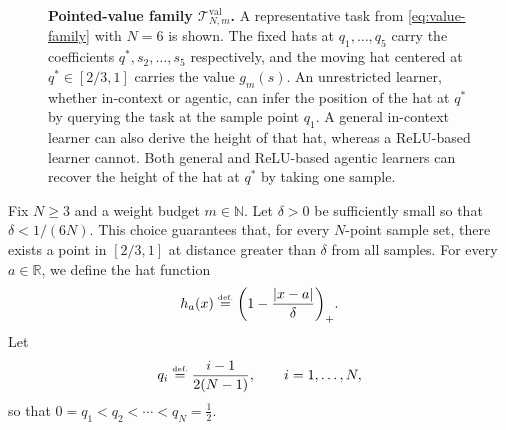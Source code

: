 \documentclass{article}
\newcommand{\eqdef }{\ensuremath{\stackrel{\mbox{\upshape\tiny def.}}{=}}}
\begin{document}
\begin{figure}[ht!]
\caption{\textbf{Pointed-value family $\mathcal{T}_{N,m}^{\mathrm{val}}$.} A representative task from \eqref{eq:value-family} with $N = 6$ is shown. The fixed hats at $q_1,\dots,q_5$ carry the coefficients $q^\ast,s_2,\dots,s_5$ respectively, and the moving hat centered at $q^\ast\in[2/3,1]$ carries the value $g_m(s)$. 
An unrestricted learner, whether in-context or agentic, can infer the position of the hat at $q^\ast$ by querying the task at the sample point $q_1$.
A general in-context learner can also derive the height of that hat, whereas a ReLU-based learner cannot. Both general and ReLU-based agentic learners can recover the height of the hat at $q^\ast$ by taking one sample.}
\label{fig:value-family}
\end{figure}
%

Fix $N\ge 3$ and a %
weight budget $m\in\mathbb N$. 
Let $\delta >0$ be sufficiently small so that $\delta<1/(6N)$.
This choice guarantees that, for every $N$-point sample set, there exists a point in $[2/3,1]$ at distance greater than $\delta$ from all samples.
For every $a\in\mathbb{R}$, we define the hat function
\begin{equation} \label{hat}
    h_a(x)\eqdef  \bigg(1-\frac{|x-a|}{\delta}\bigg)_+.
\end{equation}
Let
\begin{equation} \label{theqs}
    q_i\eqdef  \frac{i-1}{2(N-1)},
    \qquad i=1,\dots,N,
\end{equation}
so that $0=q_1<q_2<\cdots<q_N=\frac12$. 
\end{document}
